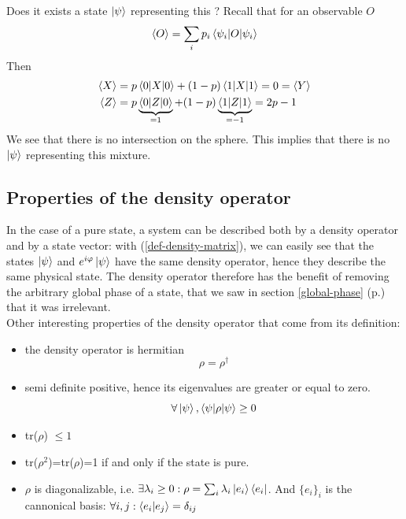 \documentclass{article}
\begin{document}
Does it exists a state $\ket{\psi}$ representing this ? Recall that for an
observable $O$
\begin{equation}
    \braket{O}=\sum_ip_i\braket{\psi_i|O|\psi_i}
\end{equation}
Then
\begin{equation}
    \begin{aligned}
        \braket{X}&=p\braket{0|X|0}+(1-p)\braket{1|X|1}=0=\braket{Y}
        \\
        \braket{Z}&=p\underbrace{\braket{0|Z|0}}_{=1} + (1-p)\underbrace{\braket{1|Z|1}}_{=-1} = 2p-1
    \end{aligned}
\end{equation}
We see that there is no intersection on the sphere. This implies that there is
no $\ket{\psi}$ representing this mixture.

\subsection{Properties of the density operator}
\label{density-matrix-properties}
In the case of a pure state, a system can be described both by a density
operator and by a state vector: with (\ref{def-density-matrix}), we can easily
see that the states $\ket{\psi}$ and $e^{i\varphi}\ket{\psi}$ have the same
density operator, hence they describe the same physical state. The density
operator therefore has the benefit of removing the arbitrary global phase of a
state, that we saw in section \ref{global-phase} (p.\pageref{global-phase}) that
it was irrelevant.\\
Other interesting properties of the density operator that come from its
definition:
\begin{itemize}[label=-]
    \item the density operator is hermitian
    \begin{equation}
        \rho = \rho^\dagger
    \end{equation}
    \item semi definite positive, hence its eigenvalues are greater or equal to
    zero.
    \begin{equation}
        \forall \ket{\psi}, \braket{\psi|\rho|\psi} \geq 0
    \end{equation}
    \item tr($\rho$) $\leq 1$
    \item tr($\rho^2$)=tr($\rho$)=1 if and only if the state is pure.
    \item $\rho$ is diagonalizable, i.e. $\exists \lambda_i \geq 0 : \rho =
        \sum_i \lambda_i \ket{e_i}\bra{e_i}$. And $\{e_i\}_i$ is the cannonical
        basis: $\forall i,j: \braket{e_i|e_j}=\delta_{ij}$
\end{itemize}
\end{document}
